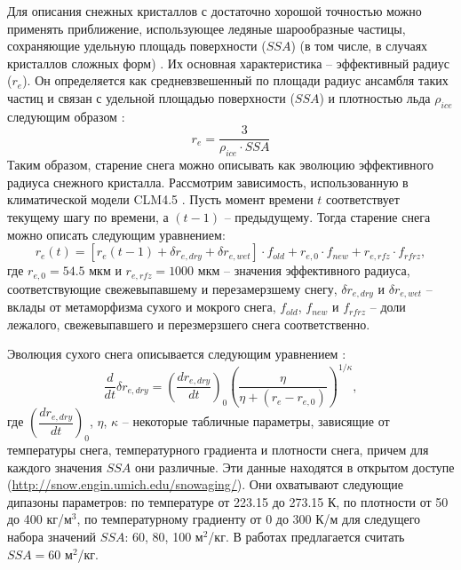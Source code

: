 \documentclass[a4paper, fontsize=14pt]{scrartcl}
\begin{document}
\newpage
Для описания снежных кристаллов с достаточно хорошой точностью можно применять приближение, использующее ледяные шарообразные частицы, сохраняющие удельную площадь поверхности ($SSA$) (в том числе, в случаях кристаллов сложных форм) \cite{Grenfell1999}. Их основная характеристика -- эффективный радиус ($r_e$). Он определяется как средневзвешенный по площади радиус ансамбля таких частиц и связан с удельной площадью поверхности ($SSA$) и плотностью льда $\rho_{ice}$ следующим образом \cite{Flanner2006}:  
\begin{equation}
    r_e = \dfrac{3} {\rho_{ice} \cdot SSA} \label{sys}
\end{equation}
Таким образом, старение снега можно описывать как эволюцию эффективного радиуса снежного кристалла. Рассмотрим зависимость, использованную в климатической модели CLM4.5 \cite{CLM4.5tech}. Пусть момент времени $t$ соответствует текущему шагу по времени, а $(t - 1)$ -- предыдущему. Тогда старение снега можно описать следующим уравнением:
\begin{equation}
    r_e(t) = [r_e (t - 1) + \delta r_{e , dry} + \delta r_{e , wet} ] \cdot f_{old} + r_{e ,0} \cdot f_{new} + r_{e , rfz} \cdot f_{rfrz}, \label{sys}
\end{equation}
где $ r_{e ,0} = 54.5 $ мкм и $r_{e , rfz} = 1000 $ мкм -- значения эффективного радиуса, соответствующие свежевыпавшему и перезамерзшему снегу, $\delta r_{e , dry}$ и $\delta r_{e , wet}$ -- вклады от метаморфизма сухого и мокрого снега, $f_{old}$, $f_{new}$ и $f_{rfrz}$ -- доли лежалого, свежевыпавшего и перезмерзшего снега соответственно.  

Эволюция сухого снега описывается следующим уравнением \cite{Flanner2007, CLM4.5tech}:
\begin{equation}
    \dfrac{d}{dt} \delta r_{e , dry} = {\left( \dfrac{dr_{e , dry}}{dt} \right)}_0 \left(\dfrac{\eta}{\eta + (r_e - r_{e, 0})}\right)^{1 / \kappa}, \label{sys}
\end{equation}
где ${\left( \dfrac{dr_{e , dry}}{dt} \right)}_0$, $\eta$, $\kappa$ -- некоторые табличные параметры, зависящие от температуры снега, температурного градиента и плотности снега, причем для каждого значения $SSA$ они различные. Эти данные находятся в открытом доступе (\url{http://snow.engin.umich.edu/snowaging/}). Они охватывают следующие дипазоны параметров: по температуре от 223.15 до 273.15 К, по плотности от 50 до 400 кг/м$^3$, по температурному градиенту от 0 до 300 К/м для следущего набора значений $SSA$: 60, 80, 100 м$^2$/кг. В работах \cite{CLM4.5tech, Flanner2006, Flanner2007} предлагается считать $SSA = 60$ м$^2$/кг.
\end{document}

